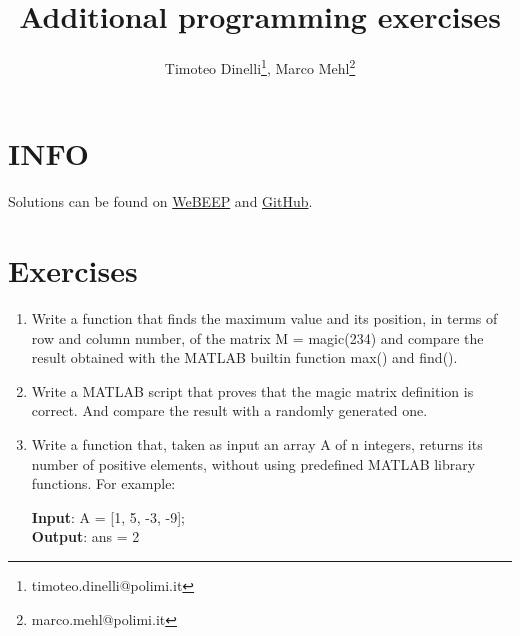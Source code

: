 \documentclass[oneside]{article}
\title{Additional programming exercises}
\author{Timoteo Dinelli\footnote{timoteo.dinelli@polimi.it}, Marco Mehl\footnote{marco.mehl@polimi.it}}
\date{}
\begin{document}
\maketitle

\section*{INFO}
Solutions can be found on \href{https://webeep.polimi.it/course/view.php?id=20808}{WeBEEP} and \href{https://github.com/Titodinelli/Calcoli-di-Processo-dell-Ingegneria-Chimica}{GitHub}.

\section*{Exercises}

\begin{enumerate}
	\item
	      Write a function that finds the maximum value and its position, in terms of row and column number, of the matrix M = magic(234) and compare the result obtained with the MATLAB builtin function max() and find().

	\item
	      Write a MATLAB script that proves that the magic matrix definition is correct. And compare the result with a randomly generated one.

	\item
	      Write a function that, taken as input an array A of n integers, returns its number of positive elements, without using predefined MATLAB library functions. For example:
	      \begin{tcolorbox}[blanker, breakable, left=5mm, before skip=10pt, after skip=10pt, borderline west={1mm}{0pt}{primarycolor}]
		      \textbf{Input}: A = [1, 5, -3, -9]; \\
		      \textbf{Output}: ans = 2
	      \end{tcolorbox}


\end{enumerate}
\end{document}
